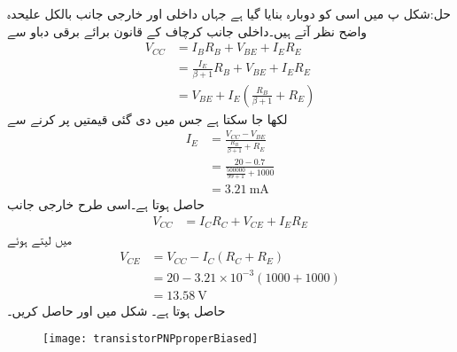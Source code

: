 حل:شکل  پ میں اسی کو دوبارہ بنایا گیا ہے جہاں داخلی اور خارجی جانب بالکل علیحدہ واضح نظر آتے ہیں۔داخلی جانب کرچاف کے قانون برائے برقی دباو سے
\begin{align*}
V_{CC}&=I_B R_B +V_{BE}+I_E R_E \\
&=\frac{I_E}{\beta +1} R_B + V_{BE}+I_E R_E\\
&=V_{BE}+I_E \left(\frac{R_B}{\beta+1}+R_E \right)
\end{align*}
لکھا جا سکتا ہے جس میں دی گئی قیمتیں پر کرنے سے
\begin{align*}
I_E&=\frac{V_{CC}-V_{BE}}{\frac{R_B}{\beta+1}+R_E}\\
&=\frac{20-0.7}{\frac{500000}{99+1}+1000}\\
&=\SI{3.21}{\milli \ampere}
\end{align*}
حاصل ہوتا ہے۔اسی طرح خارجی جانب 
\begin{align*}
V_{CC}&=I_C R_C +V_{CE}+I_E R_E
\end{align*}
میں  لیتے ہوئے
\begin{align*}
V_{CE}&=V_{CC}-I_C \left(R_C+R_E \right)\\
&=20-3.21 \times 10^{-3} \left(1000+1000 \right)\\
&=\SI{13.58}{\volt}
\end{align*}
حاصل ہوتا ہے۔
شکل  میں  اور  حاصل کریں۔
\begin{figure}
\centering
\texttt{[image: transistorPNPproperBiased]}
\caption{}
\label{شکل_ایک_سپلائی_سے_نکتہ_کارکردگی_کا_حصول_الف}
\end{figure}

